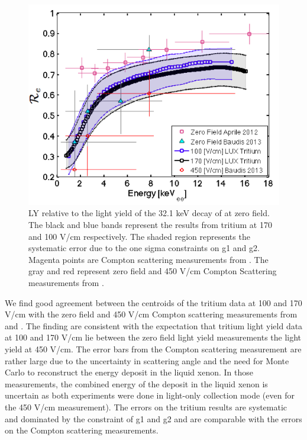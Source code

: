  \begin{figure}[h!]\centering
 \includegraphics[width=150mm]{Chapter_Flucs/Figures/LYQY_iter1/Re_fig.png}
\caption{LY relative to the light yield of the 32.1 keV decay of \KrCal at zero field. The black and blue bands represent the results from tritium at 170 and 100 V/cm respectively. The shaded region represents the systematic error due to the one sigma constraints on g1 and g2.  Magenta points are Compton scattering measurements from \cite{Aprile_LY}. The gray and red represent zero field and 450 V/cm Compton Scattering measurements from \cite{Baudis}. }
\label{fig:Re}
\end{figure}

We find good agreement between the centroids of the tritium data at 100 and 170 V/cm with the zero field and 450 V/cm Compton scattering measurements from \cite{Aprile_LY} and \cite{Baudis}. The finding are consistent with the expectation that tritium light yield data at 100 and 170 V/cm lie between the zero field light yield measurements the light yield at 450 V/cm. The error bars from the Compton scattering measurement are rather large due to the uncertainty in scattering angle and the need for Monte Carlo to reconstruct the energy deposit in the liquid xenon. In those measurements, the combined energy of the deposit in the liquid xenon is uncertain as both experiments were done in light-only collection mode \cite{Aprile_LY}  \cite{Baudis} (even for the 450 V/cm measurement). The errors on the tritium results are systematic and dominated by the constraint of g1 and g2 and are comparable with the errors on the Compton scattering measurements. 

